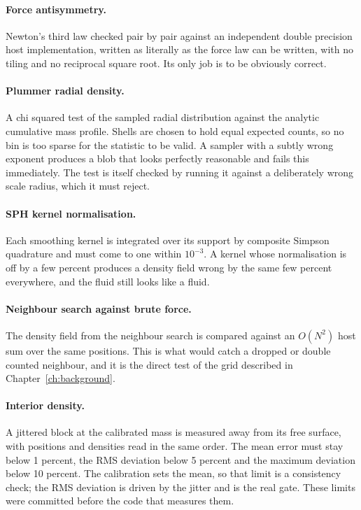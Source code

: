 \paragraph{Force antisymmetry.} Newton's third law checked pair by pair against
an independent double precision host implementation, written as literally as
the force law can be written, with no tiling and no reciprocal square root. Its
only job is to be obviously correct.

\paragraph{Plummer radial density.} A chi squared test of the sampled radial
distribution against the analytic cumulative mass profile. Shells are chosen to
hold equal expected counts, so no bin is too sparse for the statistic to be
valid. A sampler with a subtly wrong exponent produces a blob that looks
perfectly reasonable and fails this immediately. The test is itself checked by
running it against a deliberately wrong scale radius, which it must reject.

\paragraph{SPH kernel normalisation.} Each smoothing kernel is integrated over
its support by composite Simpson quadrature and must come to one within
$10^{-3}$. A kernel whose normalisation is off by a few percent produces a
density field wrong by the same few percent everywhere, and the fluid still
looks like a fluid.

\paragraph{Neighbour search against brute force.} The density field from the
neighbour search is compared against an $O(N^2)$ host sum over the same
positions. This is what would catch a dropped or double counted neighbour, and
it is the direct test of the grid described in Chapter~\ref{ch:background}.

\paragraph{Interior density.} A jittered block at the calibrated mass is measured away
from its free surface, with positions and densities read in the same order. The mean error
must stay below 1 percent, the RMS deviation below 5 percent and the maximum deviation
below 10 percent. The calibration sets the mean, so that limit is a consistency check; the
RMS deviation is driven by the jitter and is the real gate. These limits were committed
before the code that measures them.


